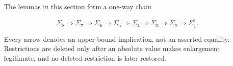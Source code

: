 The lemmas in this section form a one-way chain

\begin{equation}\label{eq:descent-chain}
 \Sigma_8\Longrightarrow\Sigma_7\Longrightarrow\Sigma_6
 \Longrightarrow\Sigma_5\Longrightarrow\Sigma_4
 \Longrightarrow\Sigma_3\Longrightarrow\Sigma_2
 \Longrightarrow\Sigma_1^\sharp.
\end{equation}

Every arrow denotes an upper-bound implication, not an asserted equality.
Restrictions are deleted only after an absolute value makes enlargement
legitimate, and no deleted restriction is later restored.
